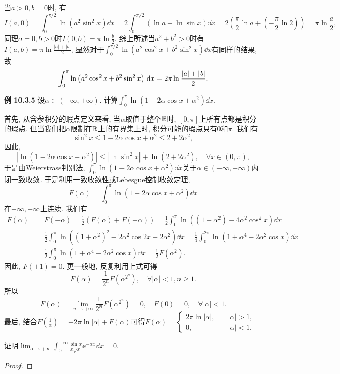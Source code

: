 \begin{quiza}
\begin{solution}
当\(a>0,b=0\)时, 有\[I(a,0)=\int_{0}^{\pi/2}\ln\left(a^2\sin^2x\right)\dd x=2\int_{0}^{\pi/2}\left(\ln a+\ln\sin x\right)\dd x=2\left(\frac{\pi}{2}\ln a+\left(-\frac{\pi}{2}\ln 2\right)\right)=\pi\ln\frac{a}{2},\]同理\(a=0,b>0\)时\(I(0,b)=\pi\ln\frac{b}{2}\). 综上所述当\(a^2+b^2>0\)时有\(I(a,b)=\pi\ln\frac{|a|+|b|}{2}\), 显然对于\(\int_{0}^{\pi/2}\ln\left(a^2\cos^2x+b^2\sin^2x\right)\dd x\)有同样的结果, 故\[\int_{0}^{\pi}\ln\left(a^2\cos^2x+b^2\sin^2x\right)\,\mathrm{d} x=2\pi\ln\frac{|a|+|b|}{2}.\qedhere\]
\end{solution}
\textbf{例 10.3.5} 设\(\alpha\in(-\infty,+\infty)\). 计算\(\int_{0}^{\pi}\ln\left(1-2\alpha\cos x+\alpha^2\right)\dd x\).
\begin{solution}
首先, 从含参积分的瑕点定义来看, 当\(\alpha\)取值于整个\(\mathbb{R}\)时, \([0,\pi]\)上所有点都是积分的瑕点. 但当我们把\(\alpha\)限制在\(\mathbb{R}\)上的有界集上时, 积分可能的瑕点只有\(0\)和\(\pi\). 我们有\[\sin^2x\leqslant 1-2\alpha\cos x+\alpha^2\leqslant 2+2\alpha^2,\]因此,\[\left|\ln\left(1-2\alpha\cos x+\alpha^2\right)\right|\leqslant \left|\ln\sin^2x\right|+\ln\left(2+2\alpha^2\right),\quad \forall x\in(0,\pi),\]于是由Weierstrass判别法, \(\int_{0}^{\pi}\ln\left(1-2\alpha\cos x+\alpha^2\right)\dd x\)关于\(\alpha\in(-\infty,+\infty)\)内闭一致收敛. 于是利用一致收敛性或Lebesgue控制收敛定理,\[F(\alpha)=\int_{0}^{\pi}\ln\left(1-2\alpha\cos x+\alpha^2\right)\dd x\]在\(-\infty,+\infty\)上连续. 我们有\[\begin{split}
F(\alpha)&=F(-\alpha)=\frac{1}{2}\left(F(\alpha)+F(-\alpha)\right)=\frac{1}{2}\int_{0}^{\pi}\ln\left((1+\alpha^2)-4\alpha^2\cos^2x\right)\dd x\\&=\frac{1}{2}\int_{0}^{\pi}\ln\left((1+\alpha^2)^2-2\alpha^2\cos2x-2\alpha^2\right)\dd x=\frac{1}{4}\int_{0}^{2\pi}\ln\left(1+\alpha^4-2\alpha^2\cos x\right)\dd x\\&=\frac{1}{2}\int_{0}^{\pi}\ln\left(1+\alpha^4-2\alpha^2\cos x\right)\dd x=\frac{1}{2}F(\alpha^2).
\end{split}\]因此, \(F(\pm 1)=0\). 更一般地, 反复利用上式可得\[F(\alpha)=\frac{1}{2^n}F\left(\alpha^{2^n}\right),\quad \forall\left|\alpha\right|<1,n\geqslant 1.\]所以\[F(\alpha)=\lim_{n\rightarrow+\infty}\frac{1}{2^n}F\left(\alpha^{2^n}\right)=0,\quad F(0)=0,\quad \forall\left|\alpha\right|<1.\]最后, 结合\(F\left(\frac{1}{\alpha}\right)=-2\pi\ln\left|\alpha\right|+F(\alpha)\)可得\(F(\alpha)=\begin{cases}
2\pi\ln\left|\alpha\right|,\quad &\left|\alpha\right|>1,\\
0,&\left|\alpha\right|<1.
\end{cases}\)
\end{solution}
\woe 证明\(\lim_{\alpha\rightarrow+\infty}\int_{0}^{+\infty}\frac{\sin x}{x\sqrt{x}}\ee^{-\alpha x}\dd x=0.\)
\begin{proof}


\end{proof}
\end{quiza}
